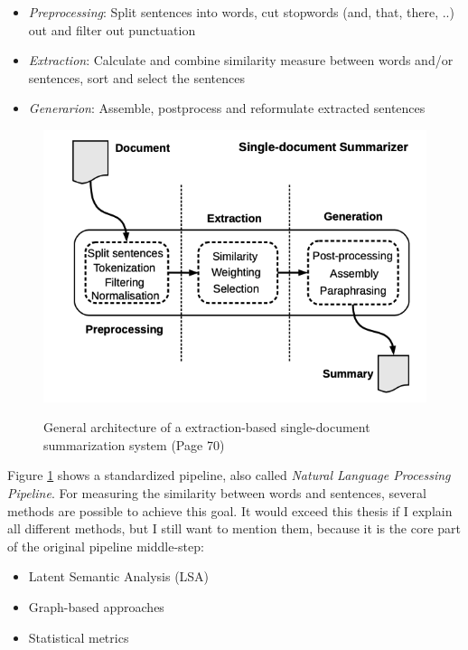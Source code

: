 \begin{itemize}
	\item \textit{Preprocessing}: Split sentences into words, cut stopwords (and, that, there, ..) out and filter out punctuation 
	\item \textit{Extraction}: Calculate and combine similarity measure between words and/or sentences, sort and select the sentences
	\item \textit{Generarion}: Assemble, postprocess and reformulate extracted sentences
\end{itemize}

\begin{figure}
	\begin{center}
		\includegraphics[width=4.5in]{photos/single_doc}\\
		\caption{General architecture of a extraction-based single-document summarization system \cite{juan} (Page 70)}\label{single}
	\end{center}
\end{figure}

Figure \ref{single} shows a standardized pipeline, also called \textit{Natural Language Processing Pipeline}. For measuring the similarity between words and sentences, several methods are possible to achieve this goal. It would exceed this thesis if I explain all different methods, but I still want to mention them, because it is the core part of the original pipeline middle-step:

\begin{itemize}
	\item Latent Semantic Analysis (LSA)
	\item Graph-based approaches
	\item Statistical metrics
\end{itemize}

